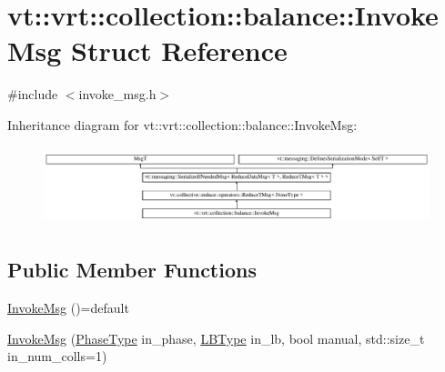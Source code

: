 \hypertarget{structvt_1_1vrt_1_1collection_1_1balance_1_1_invoke_msg}{}\section{vt\+:\+:vrt\+:\+:collection\+:\+:balance\+:\+:Invoke\+Msg Struct Reference}
\label{structvt_1_1vrt_1_1collection_1_1balance_1_1_invoke_msg}


{\ttfamily \#include $<$invoke\+\_\+msg.\+h$>$}

Inheritance diagram for vt\+:\+:vrt\+:\+:collection\+:\+:balance\+:\+:Invoke\+Msg\+:\begin{figure}[H]
\begin{center}
\leavevmode
\includegraphics[height=2.299795cm]{structvt_1_1vrt_1_1collection_1_1balance_1_1_invoke_msg}
\end{center}
\end{figure}
\subsection*{Public Member Functions}
\begin{DoxyCompactItemize}
\item 
\hyperlink{structvt_1_1vrt_1_1collection_1_1balance_1_1_invoke_msg_a1a0857477e6d447a780f33d22e535478}{Invoke\+Msg} ()=default
\item 
\hyperlink{structvt_1_1vrt_1_1collection_1_1balance_1_1_invoke_msg_a6c3d7dd2f1c45349a0490d05ef946333}{Invoke\+Msg} (\hyperlink{namespacevt_a46ce6733d5cdbd735d561b7b4029f6d7}{Phase\+Type} in\+\_\+phase, \hyperlink{namespacevt_1_1vrt_1_1collection_1_1balance_ac4f99693509affcc67db182d4aad9b5c}{L\+B\+Type} in\+\_\+lb, bool manual, std\+::size\+\_\+t in\+\_\+num\+\_\+colls=1)
\end{DoxyCompactItemize}
